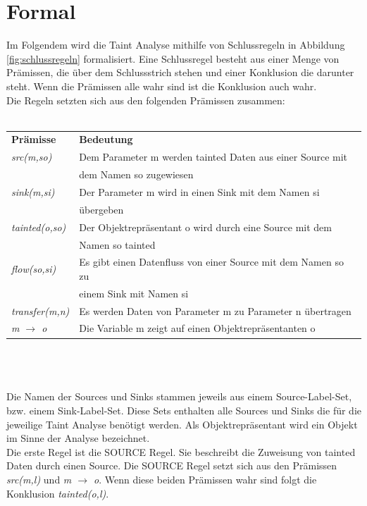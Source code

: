 \documentclass[runningheads]{llncs}
\begin{document}
\section{Formal}
Im Folgendem wird die Taint Analyse mithilfe von Schlussregeln in Abbildung \ref{fig:schlussregeln} formalisiert. Eine Schlussregel besteht aus einer Menge von Prämissen, die über dem Schlussstrich stehen und einer Konklusion die darunter steht. Wenn die Prämissen alle wahr sind ist die Konklusion auch wahr. \\
Die Regeln setzten sich aus den folgenden Prämissen zusammen:\\\\
\begin{tabular}{ll}
	\textbf{Prämisse}			& \textbf{Bedeutung}\\
	\emph{src(m,so)}			& Dem Parameter m werden tainted Daten aus einer Source mit \\ 
								& dem Namen so zugewiesen\\
	\emph{sink(m,si)} 			& Der Parameter m wird in einen Sink mit dem Namen si \\
								& übergeben\\
	\emph{tainted(o,so)} 		& Der Objektrepräsentant o wird durch eine Source mit dem \\
								& Namen so tainted\\
	\emph{flow(so,si)} 			& Es gibt einen Datenfluss von einer Source mit dem Namen so zu\\
								& einem Sink mit Namen si\\
	\emph{transfer(m,n)} 		& Es werden Daten von Parameter m zu Parameter n übertragen\\
	\emph{m $\rightarrow$ o} 	& Die Variable m zeigt auf einen Objektrepräsentanten o
\end{tabular}\\\\\\
Die Namen der Sources und Sinks stammen jeweils aus einem Source-Label-Set, bzw. einem Sink-Label-Set. Diese Sets enthalten alle Sources und Sinks die für die jeweilige Taint Analyse benötigt werden. Als Objektrepräsentant wird ein Objekt im Sinne der Analyse bezeichnet.\\
Die erste Regel ist die SOURCE Regel. Sie beschreibt die Zuweisung von tainted Daten durch einen Source. Die SOURCE Regel setzt sich aus den Prämissen \emph{src(m,l)} und \emph{m $\rightarrow$ o}. Wenn diese beiden Prämissen wahr sind folgt die Konklusion \emph{tainted(o,l)}. \\
\end{document}
